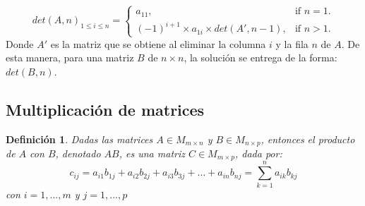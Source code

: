 \documentclass[12pt]{article}
\newtheorem{definition}{Definición}[section]
\begin{document}
        \begin{equation}
        det(A, n)_{1\leq i \leq n}=\begin{cases}
        a_{11}, & \text{if $n = 1$}.\\
        (-1)^{i+1} \times a_{1i} \times det(A', n - 1) , & \text{if $n > 1$}.
        \end{cases}
        \end{equation}
        Donde $A'$ es la matriz que se obtiene al eliminar la columna $i$ y la fila $n$ de $A$. De esta manera, para una matriz $B$ de $n \times n$, la solución se entrega de la forma:
        $det(B, n)$.
        
        \subsection{Multiplicación de matrices}
        \begin{definition}
            Dadas las matrices $A \in M_{m\times n}$ y $B \in M_{n\times p}$, entonces el producto de $A$ con $B$, denotado $AB$, es una matriz $C \in M_{m\times p}$, dada por: \cite{algebralineal}
            \[
                c_{ij} = a_{i1}b_{1j} + a_{i2}b_{2j} + a_{i3}b_{3j} + \dots + a_{in}b_{nj} = \sum_{k = 1}^{n}{a_{ik}b_{kj}}		
            \]
            con $i = 1, ..., m$ y $j = 1, ..., p$
        \end{definition}
\end{document}
